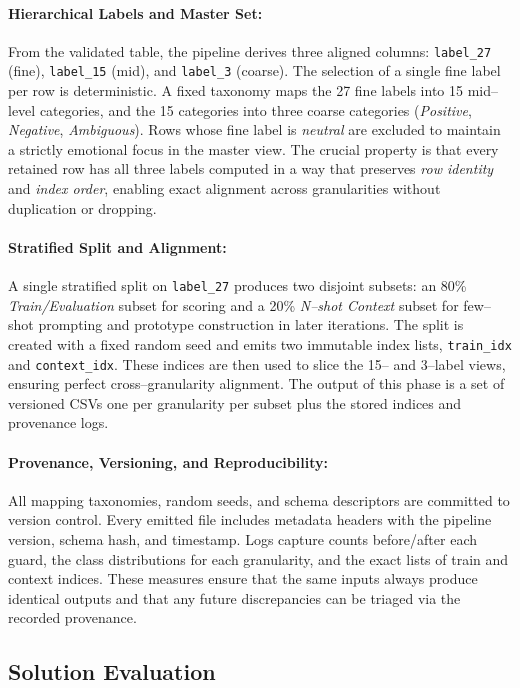 \paragraph{Hierarchical Labels and Master Set:}
From the validated table, the pipeline derives three aligned columns: \texttt{label\_27} (fine), \texttt{label\_15} (mid), and \texttt{label\_3} (coarse). The selection of a single fine label per row is deterministic. A fixed taxonomy maps the 27 fine labels into 15 mid--level categories, and the 15 categories into three coarse categories (\emph{Positive}, \emph{Negative}, \emph{Ambiguous}). Rows whose fine label is \emph{neutral} are excluded to maintain a strictly emotional focus in the master view. The crucial property is that every retained row has all three labels computed in a way that preserves \emph{row identity} and \emph{index order}, enabling exact alignment across granularities without duplication or dropping.

\paragraph{Stratified Split and Alignment:}
A single stratified split on \texttt{label\_27} produces two disjoint subsets: an 80\% \emph{Train/Evaluation} subset for scoring and a 20\% \emph{N--shot Context} subset for few--shot prompting and prototype construction in later iterations. The split is created with a fixed random seed and emits two immutable index lists, \texttt{train\_idx} and \texttt{context\_idx}. These indices are then used to slice the 15-- and 3--label views, ensuring perfect cross--granularity alignment. The output of this phase is a set of versioned CSVs one per granularity per subset plus the stored indices and provenance logs.

\paragraph{Provenance, Versioning, and Reproducibility:}
All mapping taxonomies, random seeds, and schema descriptors are committed to version control. Every emitted file includes metadata headers with the pipeline version, schema hash, and timestamp. Logs capture counts before/after each guard, the class distributions for each granularity, and the exact lists of train and context indices. These measures ensure that the same inputs always produce identical outputs and that any future discrepancies can be triaged via the recorded provenance.

\subsection{Solution Evaluation}

